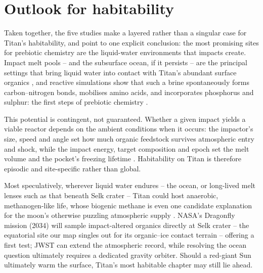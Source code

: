 \section{Outlook for habitability}

Taken together, the five studies make a layered rather than a singular case for Titan's habitability,
and point to one explicit conclusion: the most promising sites for prebiotic chemistry are the
liquid-water environments that impacts create. Impact melt pools -- and the subsurface ocean, if it
persists -- are the principal settings that bring liquid water into contact with Titan's abundant
surface organics \citep{Nicolaides2026, Crick2026}, and reactive simulations show that such a brine
spontaneously forms carbon--nitrogen bonds, mobilises amino acids, and incorporates phosphorus and
sulphur: the first steps of prebiotic chemistry \citep{Castlevetro2026}.

This potential is contingent, not guaranteed. Whether a given impact yields a viable reactor depends on
the ambient conditions when it occurs: the impactor's size, speed and angle set how much organic
feedstock survives atmospheric entry and shock, while the impact energy, target composition and epoch
set the melt volume and the pocket's freezing lifetime \citep{Nicolaides2026}. Habitability on Titan is
therefore episodic and site-specific rather than global.

Most speculatively, wherever liquid water endures -- the ocean, or long-lived melt lenses such as that
beneath Selk crater -- Titan could host anaerobic, methanogen-like life, whose biogenic methane is even
one candidate explanation for the moon's otherwise puzzling atmospheric supply \citep{IslamRahim2026}.
NASA's Dragonfly mission (2034) will sample impact-altered organics directly at Selk crater -- the
equatorial site our map singles out for its organic--ice contact terrain \citep{Lorenz2021,
Meadows2026} -- offering a first test; JWST can extend the
atmospheric record, while resolving the ocean question ultimately requires a dedicated gravity orbiter.
Should a red-giant Sun ultimately warm the surface, Titan's most habitable chapter may still lie ahead.
